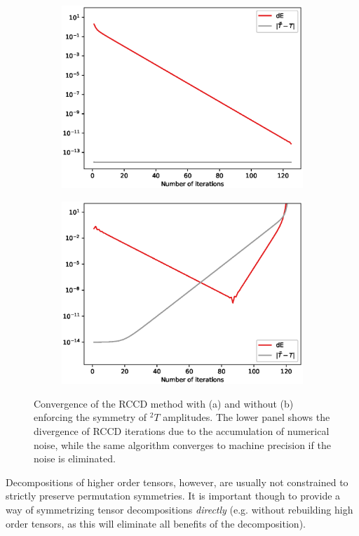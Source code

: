\begin{figure}[!ht]
\centering
\begin{subfigure}[b]{0.70\textwidth}
\includegraphics[width=1\linewidth]{figures/tcc_theory/dE_vs_niter_u_3_stable}
   \caption{}
   \label{fig:symmetry_convergence_1} 
\end{subfigure}
\begin{subfigure}[b]{0.70\textwidth}
\includegraphics[width=1\linewidth]{figures/tcc_theory/dE_vs_niter_u_3_unst}
   \caption{}
   \label{fig:symmetry_convergence_2}
\end{subfigure}
\caption{Convergence of the RCCD method with (a) and without (b) enforcing the 
symmetry of ${}^2 T$ amplitudes. The lower panel shows the divergence of RCCD 
iterations due to the accumulation of numerical noise, while the same algorithm 
converges to machine precision if the noise is eliminated.}
\label{fig:symmetry_convergence}
\end{figure}
%
Decompositions of higher order tensors, however, are usually not constrained 
to strictly preserve permutation symmetries. It is important though to provide 
a way of symmetrizing tensor decompositions \emph{directly} (e.g. without 
rebuilding high order tensors, as this will eliminate all benefits of the 
decomposition).

